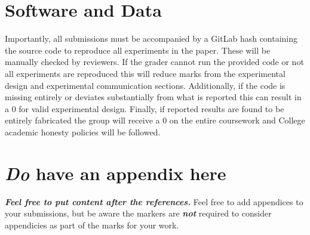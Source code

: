 \documentclass{article}
\newcommand{\csection}[1]{\section{\textcolor{imperialblue}{#1}}}
\begin{document}
\csection{Software and Data}

Importantly, all submissions must be accompanied by a GitLab hash containing the source code to reproduce all experiments in the paper. These will be manually checked by reviewers. If the grader cannot run the provided code or not all experiments are reproduced this will reduce marks from the experimental design and experimental communication sections. Additionally, if the code is missing entirely or deviates substantially from what is reported this can result in a 0 for valid experimental design. Finally, if reported results are found to be entirely fabricated the group will receive a 0 on the entire coursework and College academic honesty policies will be followed. 


\nocite{langley00}





\appendix
\csection{\emph{Do} have an appendix here}

\textbf{\emph{Feel free to put content after the references.}}
%
Feel free to add appendices to your submissions, but be aware the markers are \textit{\textbf{not}} required to consider appendicies as part of the marks for your work. 
 
\end{document}
